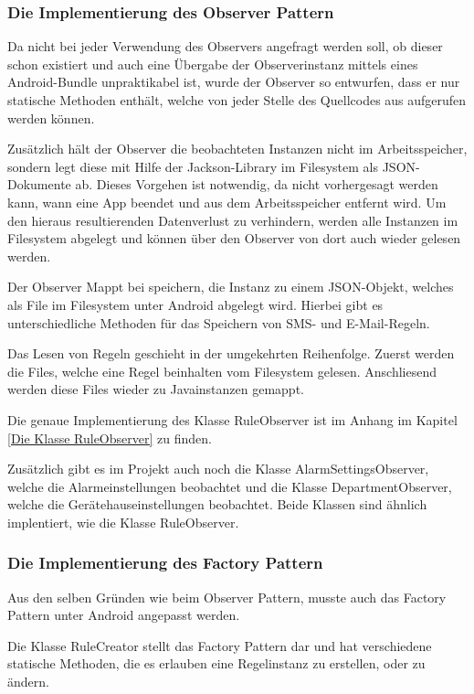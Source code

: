 \subsubsection{Die Implementierung des Observer Pattern}
Da nicht bei jeder Verwendung des Observers angefragt werden soll, ob dieser schon existiert und auch eine \"Ubergabe der Observerinstanz mittels eines Android-Bundle unpraktikabel ist, wurde der Observer so entwurfen, dass er nur statische Methoden enth\"alt, welche von jeder Stelle des Quellcodes aus aufgerufen werden k\"onnen.

Zus\"atzlich h\"alt der Observer die beobachteten Instanzen nicht im Arbeitsspeicher, sondern legt diese mit Hilfe der Jackson-Library im Filesystem als JSON-Dokumente ab.
Dieses Vorgehen ist notwendig, da nicht vorhergesagt werden kann, wann eine App beendet und aus dem Arbeitsspeicher entfernt wird. Um den hieraus resultierenden Datenverlust zu verhindern, werden alle Instanzen im Filesystem abgelegt und k\"onnen \"uber den Observer von dort auch wieder gelesen werden.

Der Observer Mappt bei speichern, die Instanz zu einem JSON-Objekt, welches als File im Filesystem unter Android abgelegt wird. Hierbei gibt es unterschiedliche Methoden f\"ur das Speichern von SMS- und E-Mail-Regeln.

Das Lesen von Regeln geschieht in der umgekehrten Reihenfolge. Zuerst werden die Files, welche eine Regel beinhalten vom Filesystem gelesen. Anschliesend werden diese Files wieder zu Javainstanzen gemappt.

Die genaue Implementierung des Klasse RuleObserver ist im Anhang im Kapitel \ref{Die Klasse RuleObserver} zu finden.

Zus\"atzlich gibt es im Projekt auch noch die Klasse AlarmSettingsObserver, welche die Alarmeinstellungen beobachtet und die Klasse DepartmentObserver, welche die Ger\"atehauseinstellungen beobachtet. Beide Klassen sind \"ahnlich implentiert, wie die Klasse RuleObserver.

\subsubsection{Die Implementierung des Factory Pattern}
Aus den selben Gr\"unden wie beim Observer Pattern, musste auch das Factory Pattern unter Android angepasst werden.

Die Klasse RuleCreator stellt das Factory Pattern dar und hat verschiedene statische Methoden, die es erlauben eine Regelinstanz zu erstellen, oder zu \"andern.

